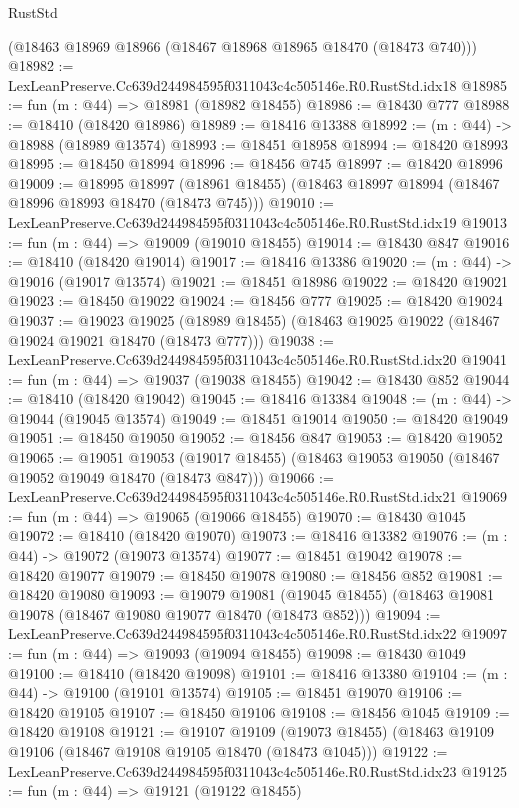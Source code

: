 \begin{lexlean}{RustStd}
\begin{coremodule}
    (@18463 @18969 @18966 (@18467 @18968 @18965 @18470 (@18473 @740)))
@18982 := LexLeanPreserve.Cc639d244984595f0311043c4c505146e.R0.RustStd.idx18
@18985 := fun (m : @44) => @18981 (@18982 @18455)
@18986 := @18430 @777
@18988 := @18410 (@18420 @18986)
@18989 := @18416 @13388
@18992 := (m : @44) -> @18988 (@18989 @13574)
@18993 := @18451 @18958
@18994 := @18420 @18993
@18995 := @18450 @18994
@18996 := @18456 @745
@18997 := @18420 @18996
@19009 := @18995
    @18997
    (@18961 @18455)
    (@18463 @18997 @18994 (@18467 @18996 @18993 @18470 (@18473 @745)))
@19010 := LexLeanPreserve.Cc639d244984595f0311043c4c505146e.R0.RustStd.idx19
@19013 := fun (m : @44) => @19009 (@19010 @18455)
@19014 := @18430 @847
@19016 := @18410 (@18420 @19014)
@19017 := @18416 @13386
@19020 := (m : @44) -> @19016 (@19017 @13574)
@19021 := @18451 @18986
@19022 := @18420 @19021
@19023 := @18450 @19022
@19024 := @18456 @777
@19025 := @18420 @19024
@19037 := @19023
    @19025
    (@18989 @18455)
    (@18463 @19025 @19022 (@18467 @19024 @19021 @18470 (@18473 @777)))
@19038 := LexLeanPreserve.Cc639d244984595f0311043c4c505146e.R0.RustStd.idx20
@19041 := fun (m : @44) => @19037 (@19038 @18455)
@19042 := @18430 @852
@19044 := @18410 (@18420 @19042)
@19045 := @18416 @13384
@19048 := (m : @44) -> @19044 (@19045 @13574)
@19049 := @18451 @19014
@19050 := @18420 @19049
@19051 := @18450 @19050
@19052 := @18456 @847
@19053 := @18420 @19052
@19065 := @19051
    @19053
    (@19017 @18455)
    (@18463 @19053 @19050 (@18467 @19052 @19049 @18470 (@18473 @847)))
@19066 := LexLeanPreserve.Cc639d244984595f0311043c4c505146e.R0.RustStd.idx21
@19069 := fun (m : @44) => @19065 (@19066 @18455)
@19070 := @18430 @1045
@19072 := @18410 (@18420 @19070)
@19073 := @18416 @13382
@19076 := (m : @44) -> @19072 (@19073 @13574)
@19077 := @18451 @19042
@19078 := @18420 @19077
@19079 := @18450 @19078
@19080 := @18456 @852
@19081 := @18420 @19080
@19093 := @19079
    @19081
    (@19045 @18455)
    (@18463 @19081 @19078 (@18467 @19080 @19077 @18470 (@18473 @852)))
@19094 := LexLeanPreserve.Cc639d244984595f0311043c4c505146e.R0.RustStd.idx22
@19097 := fun (m : @44) => @19093 (@19094 @18455)
@19098 := @18430 @1049
@19100 := @18410 (@18420 @19098)
@19101 := @18416 @13380
@19104 := (m : @44) -> @19100 (@19101 @13574)
@19105 := @18451 @19070
@19106 := @18420 @19105
@19107 := @18450 @19106
@19108 := @18456 @1045
@19109 := @18420 @19108
@19121 := @19107
    @19109
    (@19073 @18455)
    (@18463 @19109 @19106 (@18467 @19108 @19105 @18470 (@18473 @1045)))
@19122 := LexLeanPreserve.Cc639d244984595f0311043c4c505146e.R0.RustStd.idx23
@19125 := fun (m : @44) => @19121 (@19122 @18455)

\end{coremodule}
\end{lexlean}

